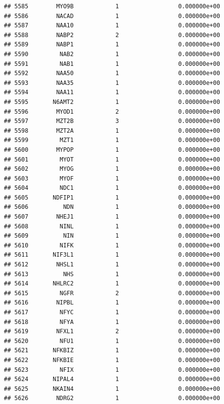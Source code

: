 \documentclass[
]{article}
\begin{document}
\begin{verbatim}
## 5585        MYO9B            1                 0.000000e+00
## 5586        NACAD            1                 0.000000e+00
## 5587        NAA10            1                 0.000000e+00
## 5588        NABP2            2                 0.000000e+00
## 5589        NABP1            1                 0.000000e+00
## 5590         NAB2            1                 0.000000e+00
## 5591         NAB1            1                 0.000000e+00
## 5592        NAA50            1                 0.000000e+00
## 5593        NAA35            1                 0.000000e+00
## 5594        NAA11            1                 0.000000e+00
## 5595       N6AMT2            1                 0.000000e+00
## 5596        MYOD1            2                 0.000000e+00
## 5597        MZT2B            3                 0.000000e+00
## 5598        MZT2A            1                 0.000000e+00
## 5599         MZT1            1                 0.000000e+00
## 5600        MYPOP            1                 0.000000e+00
## 5601         MYOT            1                 0.000000e+00
## 5602         MYOG            1                 0.000000e+00
## 5603         MYOF            1                 0.000000e+00
## 5604         NDC1            1                 0.000000e+00
## 5605       NDFIP1            1                 0.000000e+00
## 5606          NDN            1                 0.000000e+00
## 5607        NHEJ1            1                 0.000000e+00
## 5608         NINL            1                 0.000000e+00
## 5609          NIN            1                 0.000000e+00
## 5610         NIFK            1                 0.000000e+00
## 5611       NIF3L1            1                 0.000000e+00
## 5612        NHSL1            1                 0.000000e+00
## 5613          NHS            1                 0.000000e+00
## 5614       NHLRC2            1                 0.000000e+00
## 5615         NGFR            2                 0.000000e+00
## 5616        NIPBL            1                 0.000000e+00
## 5617         NFYC            1                 0.000000e+00
## 5618         NFYA            1                 0.000000e+00
## 5619        NFXL1            2                 0.000000e+00
## 5620         NFU1            1                 0.000000e+00
## 5621       NFKBIZ            1                 0.000000e+00
## 5622       NFKBIE            1                 0.000000e+00
## 5623         NFIX            1                 0.000000e+00
## 5624       NIPAL4            1                 0.000000e+00
## 5625       NKAIN4            1                 0.000000e+00
## 5626        NDRG2            1                 0.000000e+00

\end{verbatim}
\end{document}

